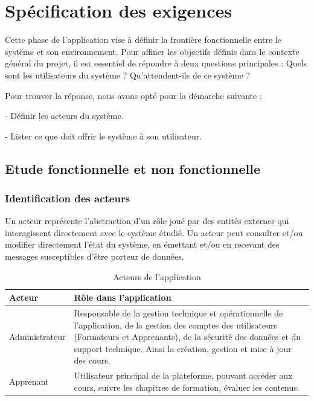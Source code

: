 \section{Spécification des exigences}

Cette phase de l’application vise à définir la frontière fonctionnelle entre le système et son environnement. Pour affiner les objectifs définis dans le contexte général du projet, il est essentiel de répondre à deux questions principales : Quels sont les utilisateurs du système ? Qu'attendent-ils de ce système ?

Pour trouver la réponse, nous avons opté pour la démarche suivante : 

- Définir les acteurs du système. 

- Lister ce que doit offrir le système à son utilisateur.


\subsection{Etude fonctionnelle et non fonctionnelle}
\subsubsection{Identification des acteurs}

Un acteur représente l’abstraction d’un rôle joué par des entités externes qui
interagissent directement avec le système étudié. Un acteur peut consulter et/ou
modifier directement l’état du système, en émettant et/ou en recevant des messages
susceptibles d'être porteur de données.

\begin{table}[htbp]
    \centering
    \begin{tabular}{|m{5cm}|m{10cm}|}
        \hline
        \textbf{Acteur} & \textbf{Rôle dans l'application} \\
        \hline
        Administrateur & Responsable de la gestion technique et opérationnelle de l'application, de la gestion des comptes des utilisateurs (Formateurs et Apprenants), de la sécurité des données et du support technique. Ainsi la création, gestion et mise à jour des cours. \\
        \hline
        Apprenant & Utilisateur principal de la plateforme, pouvant accéder aux cours, suivre les chapitres de formation, évaluer les contenus. \\
        \hline
    \end{tabular}
    \caption{Acteurs de l'application}
    \label{tab:roles}
\end{table}

